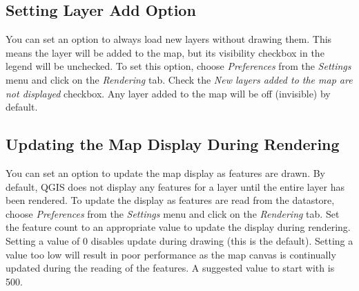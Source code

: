\subsection{Setting Layer Add
Option}
You can set an option to always load new layers without drawing them. This means
the layer will be added to the map, but its visibility checkbox in the legend
will be unchecked. To set this option, choose \textit{Preferences} from the
\textit{Settings} menu and click on the \textit{Rendering} tab. Check the
\textit{New layers added to the map are not displayed} checkbox. Any layer added
to the map will be off (invisible) by default.
\subsection{Updating the Map Display During Rendering}
You can set an option to update the map display as features are drawn. By
default, QGIS does not display any features for a layer until the entire layer
has been rendered. To update the display as features are read from the
datastore, choose \textit{Preferences} from the
\textit{Settings} menu and click on the \textit{Rendering} tab. Set the feature
count to an appropriate value to update the display during rendering. Setting a
value of 0 disables update during drawing (this is the default). Setting a value
too low will result in poor performance as the map canvas is continually updated
during the reading of the features. A suggested value to start with is 500. 

